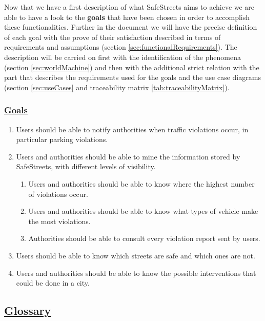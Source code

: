 	 Now that we have a first description of what SafeStreets aims to achieve we are able to have a look to the \textbf{goals} that have been chosen in order to accomplish these functionalities. Further in the document we will have the precise definition of each goal with the prove of their satisfaction described in terms of requirements and assumptions (section \ref{sec:functionalRequirements}). The description will be carried on first with the identification of the phenomena (section \ref{sec:worldMachine}) and then with the additional strict relation with the part that describes the requirements used for the goals and the use case diagrams (section \ref{sec:useCases} and traceability matrix \ref{tab:traceabilityMatrix}). 
	
	\subsubsection[Goals]{\hyperlink{toc}{Goals}}
		\label{sec:goals}
		\begin{enumerate}[label=\textbf{G\arabic*}]
			\item \label{goal:notification} Users should be able to notify authorities when traffic violations occur, in particular parking violations.
			\item \label{goal:mining} Users and authorities should be able to mine the information stored by SafeStreets, with different levels of visibility.
				\begin{enumerate}[label=\textbf{G2\Alph*}]
					\item \label{goal:miningA} Users and authorities should be able to know where the highest number of violations occur.
					\item \label{goal:miningB} Users and authorities should be able to know what types of vehicle make the most violations.
					\item \label{goal:miningC} Authorities should be able to consult every violation report sent by users.
				\end{enumerate}
			\item \label{goal:safety} Users should be able to know which streets are safe and which ones are not.
			\item \label{goal:intervention} Users and authorities should be able to know the possible interventions that could be done in a city.
		\end{enumerate}
	
\subsection[Glossary]{\hyperlink{toc}{Glossary}}
	\label{sec:glossary}
